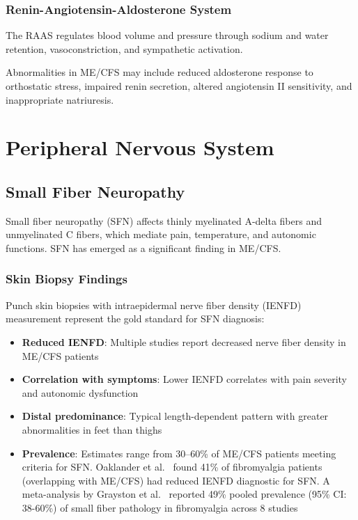 \subsubsection{Renin-Angiotensin-Aldosterone System}

The RAAS regulates blood volume and pressure through sodium and water retention, vasoconstriction, and sympathetic activation.

Abnormalities in ME/CFS may include reduced aldosterone response to orthostatic stress, impaired renin secretion, altered angiotensin II sensitivity, and inappropriate natriuresis.

\section{Peripheral Nervous System}
\label{sec:peripheral-nervous}

\subsection{Small Fiber Neuropathy}
\label{sec:sfn}

Small fiber neuropathy (SFN) affects thinly myelinated A-delta fibers and unmyelinated C fibers, which mediate pain, temperature, and autonomic functions. SFN has emerged as a significant finding in ME/CFS.

\subsubsection{Skin Biopsy Findings}

Punch skin biopsies with intraepidermal nerve fiber density (IENFD) measurement represent the gold standard for SFN diagnosis:

\begin{itemize}
    \item \textbf{Reduced IENFD}: Multiple studies report decreased nerve fiber density in ME/CFS patients~\cite{Oaklander2013sfn,Grayston2019sfn}
    \item \textbf{Correlation with symptoms}: Lower IENFD correlates with pain severity and autonomic dysfunction
    \item \textbf{Distal predominance}: Typical length-dependent pattern with greater abnormalities in feet than thighs
    \item \textbf{Prevalence}: Estimates range from 30--60\% of ME/CFS patients meeting criteria for SFN. Oaklander et al.~\cite{Oaklander2013sfn} found 41\% of fibromyalgia patients (overlapping with ME/CFS) had reduced IENFD diagnostic for SFN. A meta-analysis by Grayston et al.~\cite{Grayston2019sfn} reported 49\% pooled prevalence (95\% CI: 38-60\%) of small fiber pathology in fibromyalgia across 8 studies
\end{itemize}

